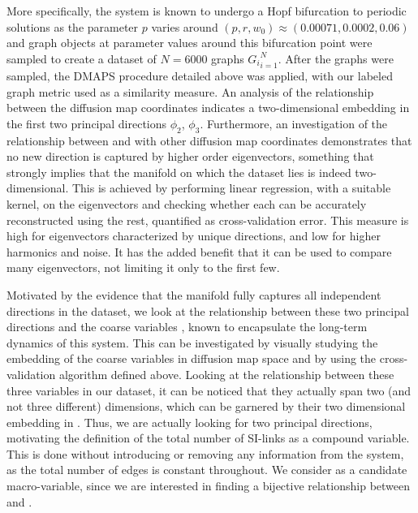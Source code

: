 More specifically, the system is known to undergo a Hopf bifurcation
to periodic solutions as the parameter $p$ varies around
$(p, r, w_0) \approx (0.00071, 0.0002, 0.06)$ and graph objects at
parameter values around this bifurcation point were sampled to create
a dataset of $N = 6000$ graphs ${G_i}_{i=1}^N$. After the graphs were sampled, the DMAPS
procedure detailed above was applied, with our labeled graph metric
used as a similarity measure. An analysis of the relationship between
the diffusion map coordinates indicates a two-dimensional embedding in
the first two principal directions $\phi_2$, $\phi_3$. Furthermore, an investigation of
the relationship between and with other diffusion map coordinates
demonstrates that no new direction is captured by higher order
eigenvectors, something that strongly implies that the manifold on
which the dataset lies is indeed two-dimensional. This is achieved by
performing linear regression, with a suitable kernel, on the
eigenvectors and checking whether each can be accurately reconstructed
using the rest, quantified as cross-validation error. This measure is
high for eigenvectors characterized by unique directions, and low for
higher harmonics and noise. It has the added benefit that it can be
used to compare many eigenvectors, not limiting it only to the first
few.

Motivated by the evidence that the manifold fully captures all
independent directions in the dataset, we look at the relationship
between these two principal directions and the coarse variables ,
known to encapsulate the long-term dynamics of this system. This can
be investigated by visually studying the embedding of the coarse
variables in diffusion map space and by using the cross-validation
algorithm defined above. Looking at the relationship between these
three variables in our dataset, it can be noticed that they actually
span two (and not three different) dimensions, which can be garnered
by their two dimensional embedding in . Thus, we are actually looking
for two principal directions, motivating the definition of the total
number of SI-links as a compound variable. This is done without
introducing or removing any information from the system, as the total
number of edges is constant throughout. We consider as a candidate
macro-variable, since we are interested in finding a bijective
relationship between and .

